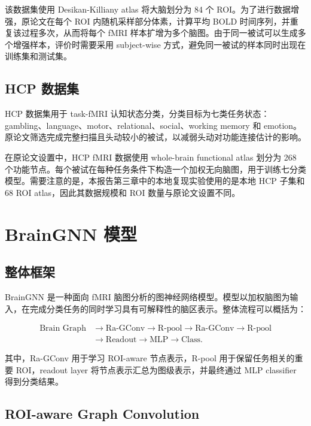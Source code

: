 该数据集使用 Desikan-Killiany atlas 将大脑划分为 84 个 ROI。为了进行数据增强，原论文在每个 ROI 内随机采样部分体素，计算平均 BOLD 时间序列，并重复该过程多次，从而将每个 fMRI 样本扩增为多个脑图。由于同一被试可以生成多个增强样本，评价时需要采用 subject-wise 方式，避免同一被试的样本同时出现在训练集和测试集。

\subsection{HCP 数据集}

HCP 数据集用于 task-fMRI 认知状态分类，分类目标为七类任务状态：gambling、language、motor、relational、social、working memory 和 emotion。原论文筛选完成完整扫描且头动较小的被试，以减弱头动对功能连接估计的影响。

在原论文设置中，HCP fMRI 数据使用 whole-brain functional atlas 划分为 268 个功能节点。每个被试在每种任务条件下构造一个加权无向脑图，用于训练七分类模型。需要注意的是，本报告第三章中的本地复现实验使用的是本地 HCP 子集和 68 ROI atlas，因此其数据规模和 ROI 数量与原论文设置不同。

\section{BrainGNN 模型}

\subsection{整体框架}

BrainGNN 是一种面向 fMRI 脑图分析的图神经网络模型。模型以加权脑图为输入，在完成分类任务的同时学习具有可解释性的脑区表示。整体流程可以概括为：

\begin{equation}
  \begin{aligned}
    \text{Brain Graph}
    &\rightarrow
    \text{Ra-GConv}
    \rightarrow
    \text{R-pool}
    \rightarrow
    \text{Ra-GConv}
    \rightarrow
    \text{R-pool} \\
    &\rightarrow
    \text{Readout}
    \rightarrow
    \text{MLP}
    \rightarrow
    \text{Class}.
  \end{aligned}
\end{equation}

其中，Ra-GConv 用于学习 ROI-aware 节点表示，R-pool 用于保留任务相关的重要 ROI，readout layer 将节点表示汇总为图级表示，并最终通过 MLP classifier 得到分类结果。

\subsection{ROI-aware Graph Convolution}

